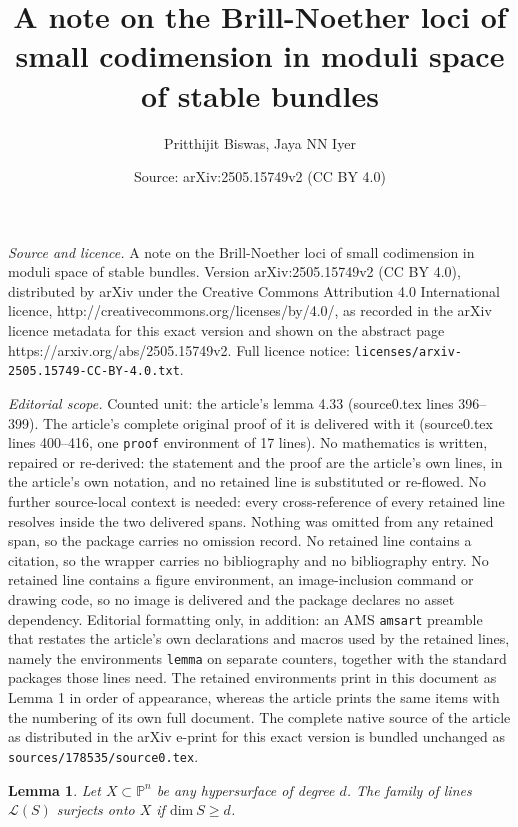 \documentclass[10pt,a4paper]{amsart}
\title{A note on the Brill-Noether loci of small codimension in moduli space of stable bundles}
\author{Pritthijit Biswas, Jaya NN Iyer}
\date{Source: arXiv:2505.15749v2 (CC BY 4.0)}
\newtheorem{lemma}{Lemma}
\begin{document}
\maketitle

\noindent\emph{Source and licence.} A note on the Brill-Noether loci of small codimension in moduli space of stable bundles. Version arXiv:2505.15749v2 (CC BY 4.0), distributed by arXiv under the Creative Commons Attribution 4.0 International licence, http://creativecommons.org/licenses/by/4.0/, as recorded in the arXiv licence metadata for this exact version and shown on the abstract page https://arxiv.org/abs/2505.15749v2. Full licence notice: \texttt{licenses/arxiv-2505.15749-CC-BY-4.0.txt}.\par\smallskip

\noindent\textit{Editorial scope.} Counted unit: the article's lemma 4.33 (source0.tex lines 396--399). The article's complete original proof of it is delivered with it (source0.tex lines 400--416, one \texttt{proof} environment of 17 lines). No mathematics is written, repaired or re-derived: the statement and the proof are the article's own lines, in the article's own notation, and no retained line is substituted or re-flowed.  No further source-local context is needed: every cross-reference of every retained line resolves inside the two delivered spans.  Nothing was omitted from any retained span, so the package carries no omission record.  No retained line contains a citation, so the wrapper carries no bibliography and no bibliography entry.  No retained line contains a figure environment, an image-inclusion command or drawing code, so no image is delivered and the package declares no asset dependency.  Editorial formatting only, in addition: an AMS \texttt{amsart} preamble that restates the article's own declarations and macros used by the retained lines, namely the environments \texttt{lemma} on separate counters, together with the standard packages those lines need.  The retained environments print in this document as Lemma 1 in order of appearance, whereas the article prints the same items with the numbering of its own full document.  The complete native source of the article as distributed in the arXiv e-print for this exact version is bundled unchanged as \texttt{sources/178535/source0.tex}.
\begin{lemma}\label{4.33}
Let $X\subset \mathbb{P}^n$ be any hypersurface of degree $d$.
The family of lines $\mathcal{L}(S)$ surjects onto $X$ if $\mbox{dim}~S\geq d$.
\end{lemma}
\end{document}
